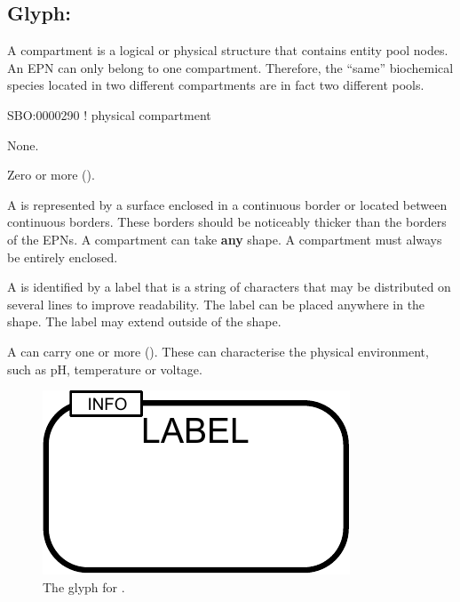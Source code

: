 \subsection{Glyph: }
\label{sec:compartment}

A compartment is a logical or physical structure that contains entity pool nodes. An EPN can only belong to one compartment. Therefore, the ``same'' biochemical species located in two different compartments are in fact two different pools.

\begin{glyphDescription}

\glyphSboTerm  SBO:0000290 ! physical compartment


\glyphIncoming
None.



\glyphOutgoing
Zero or more  ().


\glyphContainer
A  is represented by a surface enclosed in a continuous border or located between continuous borders.
These borders should be noticeably thicker than the borders of the EPNs.
A compartment can take \textbf{any} shape.
A compartment must always be entirely enclosed.

\glyphLabel
A  is identified by a label that is  a string of characters that may be distributed on several lines to improve readability.
The label can be placed anywhere in the shape.
The label may extend outside of the shape.

\glyphAux
A  can carry one or more  ().
These can characterise the physical environment, such as pH, temperature or voltage.




\end{glyphDescription}

\begin{figure}[H]
  \centering
  \includegraphics{images/compartment}
  \caption{The \PD glyph for .}
  \label{fig:compartment}
\end{figure}

